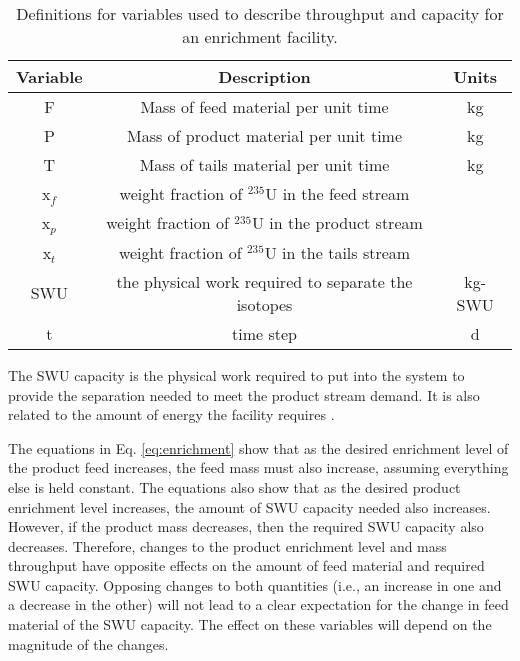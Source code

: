 \begin{table}
    \centering
    \caption{Definitions for variables used to describe throughput and 
    capacity for an enrichment facility.}
    \label{tab:enrichment_variables}
    \begin{tabular}{c c c}
        \hline
        Variable & Description & Units\\\hline
        F & Mass of feed material per unit time & kg\\
        P & Mass of product material per unit time & kg \\
        T & Mass of tails material per unit time & kg\\
        x$_f$ & weight fraction of $^{235}$U in the feed stream &\\
        x$_p$ & weight fraction of $^{235}$U in the product stream & \\
        x$_t$ & weight fraction of $^{235}$U in the tails stream & \\
        \gls{SWU} & the physical work required to separate the isotopes & kg-SWU\\
        t & time step & d\\
        \hline
    \end{tabular}
\end{table}

\noindent The \acrfull{SWU} capacity 
is the physical work required to put into the system to provide the 
separation needed to meet the product stream demand. It is also related 
to the amount of energy the facility 
requires \cite{tsoulfanidis_nuclear_2013}. 

The equations in Eq. \ref{eq:enrichment} show that as the desired enrichment level 
of the product feed increases, the feed mass must also increase, assuming everything 
else is held constant. The equations also show that as the desired 
product 
enrichment level increases, the amount of \gls{SWU} capacity needed also increases. 
However, if the product mass decreases, then the required \gls{SWU} capacity 
also decreases. Therefore, changes to the product enrichment level and mass 
throughput have opposite effects on the amount of feed material and required 
\gls{SWU} capacity. Opposing changes to both quantities 
(i.e., an increase in one and a decrease in the other) will not lead to a clear 
expectation for the change in feed material of the \gls{SWU} capacity. 
The effect 
on these variables will depend on the magnitude of the changes.

